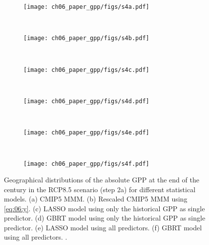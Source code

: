 \begin{figure}[p]
  \centering
  \begin{subfigure}[b]{\SubfigureWidth{}}
    \texttt{[image: ch06\_paper\_gpp/figs/s4a.pdf]}
    \caption{}
    \label{fig:app:b:step2a_results:a}
  \end{subfigure}
  ~
  \begin{subfigure}[b]{\SubfigureWidth{}}
    \texttt{[image: ch06\_paper\_gpp/figs/s4b.pdf]}
    \caption{}
    \label{fig:app:b:step2a_results:b}
  \end{subfigure}
  \\
    \begin{subfigure}[b]{\SubfigureWidth{}}
    \texttt{[image: ch06\_paper\_gpp/figs/s4c.pdf]}
    \caption{}
    \label{fig:app:b:step2a_results:c}
  \end{subfigure}
  ~
  \begin{subfigure}[b]{\SubfigureWidth{}}
    \texttt{[image: ch06\_paper\_gpp/figs/s4d.pdf]}
    \caption{}
    \label{fig:app:b:step2a_results:d}
  \end{subfigure}
  \\
    \begin{subfigure}[b]{\SubfigureWidth{}}
    \texttt{[image: ch06\_paper\_gpp/figs/s4e.pdf]}
    \caption{}
    \label{fig:app:b:step2a_results:e}
  \end{subfigure}
  ~
  \begin{subfigure}[b]{\SubfigureWidth{}}
    \texttt{[image: ch06\_paper\_gpp/figs/s4f.pdf]}
    \caption{}
    \label{fig:app:b:step2a_results:f}
  \end{subfigure}
  \caption{Geographical distributions of the absolute \acf{GPP} at the end of
    the  century in the \acs{RCP}8.5 scenario (step 2a) for different
    statistical models. (a) \acs{CMIP}5 \acf{MMM}. (b) Rescaled \acs{CMIP}5
    \acs{MMM} using \cref{eq:06:y}. (c) \Acf{LASSO} model using only the
    historical \acs{GPP} as single predictor. (d) \Acf{GBRT} model using only
    the historical \acs{GPP} as single predictor. (e) \acs{LASSO} model using
    all predictors. (f) \acs{GBRT} model using all predictors.
    .}
  \label{fig:app:b:step2a_results}
\end{figure}


